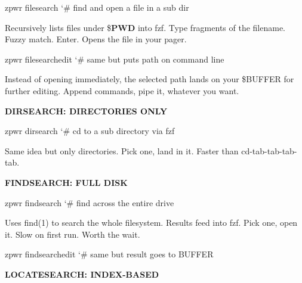 \documentclass[11pt,a4paper,twoside]{book}
\begin{document}
\begin{codebox}
\color{neongreen}zpwr filesearch          {\char`\#} find and open a file in a sub dir\\
\end{codebox}

Recursively lists files under \$\textbf{PWD} into fzf. Type fragments of the filename. Fuzzy match. Enter. Opens the file in your pager.

\begin{codebox}
\color{neongreen}zpwr filesearchedit      {\char`\#} same but puts path on command line\\
\end{codebox}

Instead of opening immediately, the selected path lands on your \$BUFFER for further editing. Append commands, pipe it, whatever you want.


\vspace{12pt}
{\bfseries\color{neonyellow} DIRSEARCH: DIRECTORIES ONLY}\vspace{4pt}

\begin{codebox}
\color{neongreen}zpwr dirsearch           {\char`\#} cd to a sub directory via fzf\\
\end{codebox}

Same idea but only directories. Pick one, land in it. Faster than cd-tab-tab-tab-tab.


\vspace{12pt}
{\bfseries\color{neonyellow} FINDSEARCH: FULL DISK}\vspace{4pt}

\begin{codebox}
\color{neongreen}zpwr findsearch          {\char`\#} find across the entire drive\\
\end{codebox}

Uses find(1) to search the whole filesystem. Results feed into fzf. Pick one, open it. Slow on first run. Worth the wait.

\begin{codebox}
\color{neongreen}zpwr findsearchedit      {\char`\#} same but result goes to BUFFER\\
\end{codebox}


\vspace{12pt}
{\bfseries\color{neonyellow} LOCATESEARCH: INDEX-BASED}\vspace{4pt}
\end{document}
